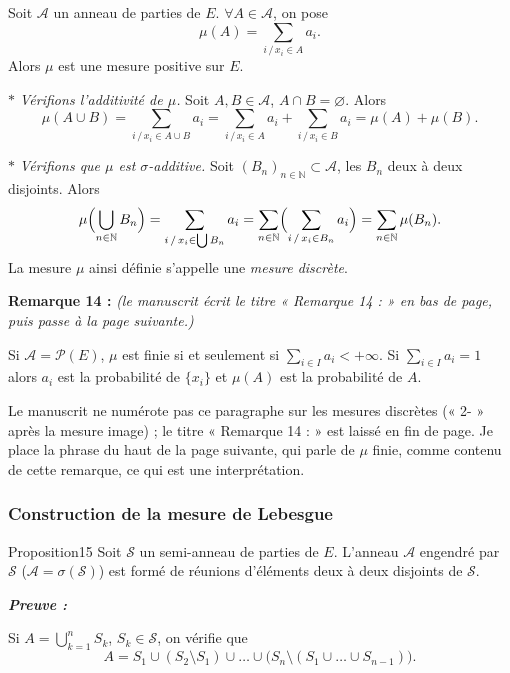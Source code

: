 \documentclass[11pt,a4paper]{article}
\newcommand{\N}{\mathbb{N}}
\newcommand{\A}{\mathscr{A}}
\newcommand{\Pp}{\mathscr{P}}
\newcommand{\Ss}{\mathscr{S}}
\newenvironment{preuve}{\par\textit{\textbf{Preuve :}}\par\nopagebreak[4]}{\par}
\begin{document}
Soit $\A$ un anneau de parties de $E$. $\forall A\in\A$, on pose
\[
  \mu(A)=\sum_{i\,/\,x_i\in A}a_i .
\]
Alors $\mu$ est une mesure positive sur $E$.

$\ast$ \emph{Vérifions l'additivité de $\mu$.} Soit $A,B\in\A$, $A\cap B=\varnothing$. Alors
\[
  \mu(A\cup B)=\sum_{i\,/\,x_i\in A\cup B}a_i=\sum_{i\,/\,x_i\in A}a_i+\sum_{i\,/\,x_i\in B}a_i=\mu(A)+\mu(B).
\]

$\ast$ \emph{Vérifions que $\mu$ est $\sigma$-additive.} Soit $(B_n)_{n\in\N}\subset\A$, les $B_n$ deux à deux disjoints. Alors
\[
  \mu\Bigl(\bigcup_{n\in\N}B_n\Bigr)=\sum_{i\,/\,x_i\in\bigcup B_n}a_i=\sum_{n\in\N}\Bigl(\sum_{i\,/\,x_i\in B_n}a_i\Bigr)=\sum_{n\in\N}\mu(B_n).
\]
La mesure $\mu$ ainsi définie s'appelle une \emph{mesure discrète}.

\textbf{\color{red!70!black}Remarque 14 :} \textit{(le manuscrit écrit le titre « Remarque 14 : » en bas de page, puis passe à la page suivante.)}

Si $\A=\Pp(E)$, $\mu$ est finie si et seulement si $\sum_{i\in I}a_i<+\infty$. Si $\sum_{i\in I}a_i=1$ alors $a_i$ est la probabilité de $\{x_i\}$
et $\mu(A)$ est la probabilité de $A$.

\begin{note}
Le manuscrit ne numérote pas ce paragraphe sur les mesures discrètes (« 2- » après la mesure image) ; le titre « Remarque 14 : » est laissé en fin de page.
Je place la phrase du haut de la page suivante, qui parle de $\mu$ finie, comme contenu de cette remarque, ce qui est une interprétation.
\end{note}

\subsubsection*{Construction de la mesure de Lebesgue}

\begin{enonce}{Proposition}{15}
Soit $\Ss$ un semi-anneau de parties de $E$. L'anneau $\A$ engendré par $\Ss$ ($\A=\sigma(\Ss)$) est formé de réunions d'éléments deux à deux
disjoints de $\Ss$.
\end{enonce}

\begin{preuve}\end{preuve}
Si $A=\bigcup_{k=1}^{n}S_k$, $S_k\in\Ss$, on vérifie que
\[
  A=S_1\cup(S_2\setminus S_1)\cup\dots\cup\bigl(S_n\setminus(S_1\cup\dots\cup S_{n-1})\bigr).
\]
\end{document}
